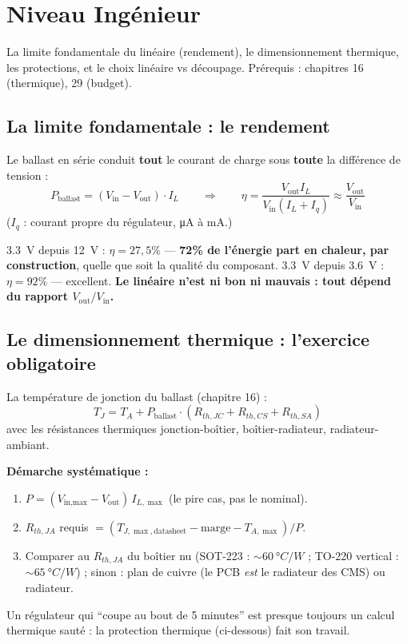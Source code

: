 \documentclass[12pt,a4paper,twoside]{book}
\begin{document}
\section{Niveau Ingénieur}

\begin{ingenieur}
La limite fondamentale du linéaire (rendement), le dimensionnement thermique, les protections, et le choix linéaire vs découpage. Prérequis : chapitres 16 (thermique), 29 (budget).
\end{ingenieur}

\subsection{La limite fondamentale : le rendement}

\begin{formule}
Le ballast en série conduit \textbf{tout} le courant de charge sous \textbf{toute} la différence de tension :
\[
P_{\text{ballast}} = (V_{\text{in}} - V_{\text{out}})\cdot I_L
\qquad\Rightarrow\qquad
\boxed{\eta = \frac{V_{\text{out}} I_L}{V_{\text{in}} (I_L + I_q)} \approx \frac{V_{\text{out}}}{V_{\text{in}}}}
\]
($I_q$ : courant propre du régulateur, \si{\micro A} à mA.)

\SI{3.3}{V} depuis \SI{12}{V} : $\eta = 27{,}5\%$ --- \textbf{72\% de l'énergie part en chaleur, par construction}, quelle que soit la qualité du composant. \SI{3.3}{V} depuis \SI{3.6}{V} : $\eta = 92\%$ --- excellent. \textbf{Le linéaire n'est ni bon ni mauvais : tout dépend du rapport $V_{\text{out}}/V_{\text{in}}$.}
\end{formule}

\subsection{Le dimensionnement thermique : l'exercice obligatoire}

\begin{formule}
La température de jonction du ballast (chapitre 16) :
\[
T_J = T_A + P_{\text{ballast}} \cdot (R_{th,JC} + R_{th,CS} + R_{th,SA})
\]
avec les résistances thermiques jonction-boîtier, boîtier-radiateur, radiateur-ambiant.

\textbf{Démarche systématique :}
\begin{enumerate}[nosep]
\item $P = (V_{\text{in,max}} - V_{\text{out}})\, I_{L,\max}$ (le pire cas, pas le nominal).
\item $R_{th,JA}$ requis $= (T_{J,\max,\text{datasheet}} - \text{marge} - T_{A,\max})/P$.
\item Comparer au $R_{th,JA}$ du boîtier nu (SOT-223 : $\sim\SI{60}{°C/W}$ ; TO-220 vertical : $\sim\SI{65}{°C/W}$) ; sinon : plan de cuivre (le PCB \textit{est} le radiateur des CMS) ou radiateur.
\end{enumerate}
Un régulateur qui ``coupe au bout de 5 minutes'' est presque toujours un calcul thermique sauté : la protection thermique (ci-dessous) fait son travail.
\end{formule}
\end{document}

